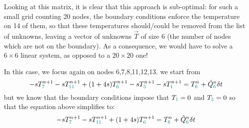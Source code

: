 Looking at this matrix, it is clear that this approach is sub-optimal: for such a small grid counting
20 nodes, the boundary conditions enforce the temperature on 14 of them, so that these
temperatures should/could be removed from the list of unknowns, leaving a vector 
of unknowns $\vec{T}$ of size 6 (the number of nodes which are not on the boundary).
As a consequence, we would have to solve a $6\times 6$ linear system, as opposed to a $20\times 20$ one!

In this case, we focus again on nodes 6,7,8,11,12,13.
we start from 
\begin{equation}
-s T_{{\color{teal} 7}}^{n+1}
-s T_{{\color{teal} 11}}^{n+1} 
+(1+4s)T_{{\color{teal} 6}}^{n+1} 
-s T_{{\color{teal} 5}}^{n+1} 
-s T_{{\color{teal} 1}}^{n+1} 
= T_{{\color{teal} 6}}^n 
+\tilde{Q}_{{\color{teal} 6}}^n \delta t
\end{equation}
but we know that the boundary conditions impose that $T_{\color{teal}1}=0$ 
and $T_{\color{teal}5}=0$ so that the equation above simplifies to:
\begin{equation}
-s T_{{\color{teal} 7}}^{n+1}
-s T_{{\color{teal} 11}}^{n+1} 
+(1+4s)T_{{\color{teal} 6}}^{n+1} 
= T_{{\color{teal} 6}}^n 
+\tilde{Q}_{{\color{teal} 6}}^n\delta t
\end{equation}

